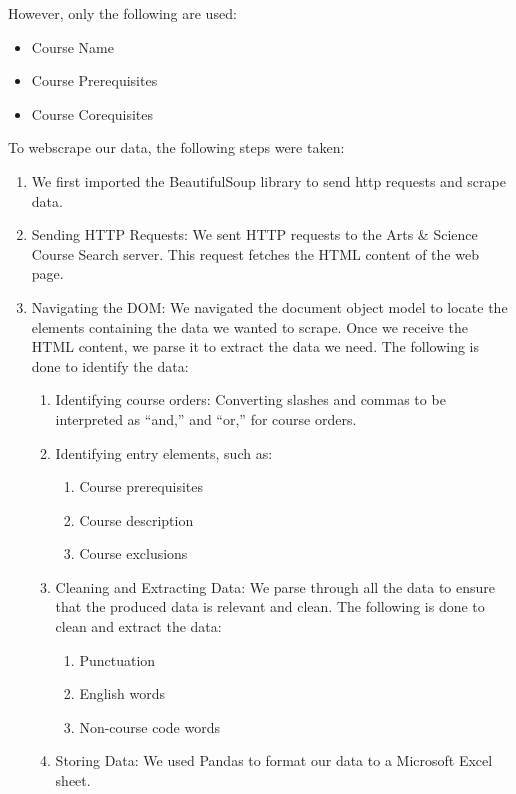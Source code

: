 \documentclass[fontsize=11pt]{article}
\begin{document}
However, only the following are used:

\begin{itemize}
  \item Course Name
  \item Course Prerequisites
  \item Course Corequisites
\end{itemize}

To webscrape our data, the following steps were taken:
 \begin{enumerate}
  \item We first imported the BeautifulSoup library to send http requests and scrape data. 
  \item Sending HTTP Requests: We sent HTTP requests to the Arts \& Science Course Search server. This request fetches the HTML content of the web page.
  \item Navigating the DOM: We navigated the document object model to locate the elements containing the data we wanted to scrape. Once we receive the HTML content, we parse it to extract the data we need. The following is done to identify the data:
  \begin{enumerate}
      \item Identifying course orders: Converting slashes and commas to be interpreted as “and,” and “or,” for course orders. 
      \item Identifying entry elements, such as: \begin{enumerate}
          \item Course prerequisites
          \item Course description
          \item Course exclusions
      \end{enumerate}
  \item Cleaning and Extracting Data: We parse through all the data to ensure that the produced data is relevant and clean. The following is done to clean and extract the data: \begin{enumerate}
          \item Punctuation
          \item English words
          \item Non-course code words
      \end{enumerate}
  \item Storing Data: We used Pandas to format our data to a Microsoft Excel sheet. 
  \end{enumerate}
\end{enumerate}
\end{document}
